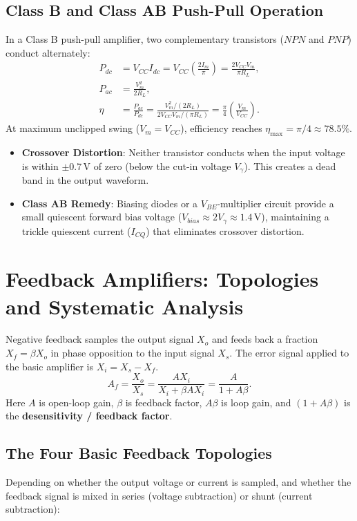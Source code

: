 \documentclass[12pt,a4paper]{article}
\begin{document}
\subsection{Class B and Class AB Push-Pull Operation}
In a Class B push-pull amplifier, two complementary transistors ($NPN$ and $PNP$) conduct alternately:
\[
\begin{aligned}
P_{dc} &= V_{CC} I_{dc} = V_{CC} \left(\frac{2I_m}{\pi}\right) = \frac{2V_{CC}V_m}{\pi R_L},\\
P_{ac} &= \frac{V_m^2}{2R_L},\\
\eta &= \frac{P_{ac}}{P_{dc}} = \frac{V_m^2 / (2R_L)}{2V_{CC}V_m / (\pi R_L)} = \frac{\pi}{4}\left(\frac{V_m}{V_{CC}}\right).
\end{aligned}
\]
At maximum unclipped swing ($V_m = V_{CC}$), efficiency reaches $\eta_{\max} = \pi/4 \approx 78.5\%$.
\begin{itemize}[leftmargin=1.5em, itemsep=2pt]
  \item \textbf{Crossover Distortion}: Neither transistor conducts when the input voltage is within $\pm 0.7\,\mathrm{V}$ of zero (below the cut-in voltage $V_\gamma$). This creates a dead band in the output waveform.
  \item \textbf{Class AB Remedy}: Biasing diodes or a $V_{BE}$-multiplier circuit provide a small quiescent forward bias voltage ($V_{bias} \approx 2 V_\gamma \approx 1.4\,\mathrm{V}$), maintaining a trickle quiescent current ($I_{CQ}$) that eliminates crossover distortion.
\end{itemize}

\section{Feedback Amplifiers: Topologies and Systematic Analysis}

\begin{tcolorbox}[defbox, title={Feedback Principle and Closed-Loop Gain}]
Negative feedback samples the output signal $X_o$ and feeds back a fraction $X_f = \beta X_o$ in phase opposition to the input signal $X_s$. The error signal applied to the basic amplifier is $X_i = X_s - X_f$.
\[
A_f = \frac{X_o}{X_s} = \frac{A X_i}{X_i + \beta A X_i} = \frac{A}{1 + A\beta}.
\]
Here $A$ is open-loop gain, $\beta$ is feedback factor, $A\beta$ is loop gain, and $(1+A\beta)$ is the \textbf{desensitivity / feedback factor}.
\end{tcolorbox}

\subsection{The Four Basic Feedback Topologies}
Depending on whether the output voltage or current is sampled, and whether the feedback signal is mixed in series (voltage subtraction) or shunt (current subtraction):
\end{document}
